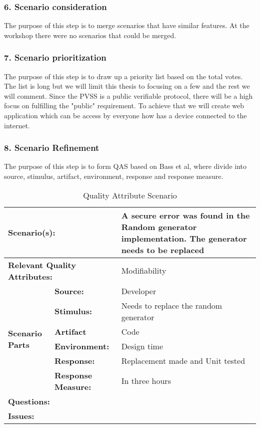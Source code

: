 \subsubsection{6. Scenario consideration}
The purpose of this step is to merge scenarios that have similar features. At the workshop there were no scenarios that could be merged.

\subsubsection{7. Scenario prioritization}
The purpose of this step is to draw up a priority list based on the total votes. The list is long but we will limit this thesis to focusing on a few and the rest we will comment. Since the PVSS is a public verifiable protocol, there will be a high focus on fulfilling the "public" requirement. To achieve that we will create web application which can be access by everyone how has a device connected to the internet.

\subsubsection{8. Scenario Refinement}
The purpose of this step is to form QAS based on Bass et al, where divide into source, stimulus, artifact, environment, response and response measure. 



\begin{table}[H]
\begin{center}
\begin{tabular}{|p{0.3cm}|p{2.5cm}|p{8cm}|}
  \hline
  \multicolumn{2}{|p{3cm}|}{\bfseries Scenario(s):} & A secure error was found in the Random generator implementation. The generator needs to be replaced \\
  \hline
  \multicolumn{2}{|p{3cm}|}{\bfseries Relevant Quality Attributes:} & Modifiability\\
  \hline
  \multirow{6}{*}{\begin{sideways}{\bfseries Scenario Parts}\end{sideways}}
  & {\bfseries Source:} & Developer \\
  \cline{2-3}
  & {\bfseries Stimulus:} & Needs to replace the random generator \\
  \cline{2-3}
  & {\bfseries Artifact} &  Code \\
  \cline{2-3}
  & {\bfseries Environment:} &  Design time \\
  \cline{2-3}
  & {\bfseries Response:} &  Replacement made and Unit tested\\
  \cline{2-3}
  & {\bfseries Response Measure:} & In three hours\\
  \hline
  \multicolumn{2}{|p{3cm}|}{\bfseries Questions:} &  \\
  \hline
  \multicolumn{2}{|p{3cm}|}{\bfseries Issues:} &  \\
  \hline
\end{tabular}
\caption{Quality Attribute Scenario}
\end{center}
\end{table}

